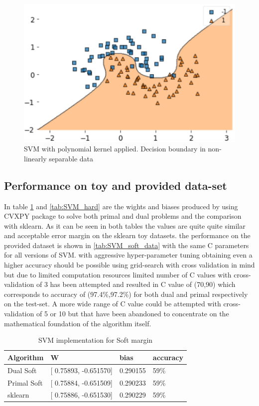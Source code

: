 \documentclass[10pt,onecolumn,letterpaper]{article}
\begin{document}
\begin{figure}[htb]
  \includegraphics[width=\linewidth]{svm_k_non.png}
  \caption{SVM with polynomial kernel applied. Decision boundary in non-linearly separable data}
  \label{fig:svm_exp_k}
\end{figure}





\subsection{Performance on toy and provided data-set}
In table \ref{tab:SVM_soft} and \ref{tab:SVM_hard} are the wights and biases produced by using CVXPY package to solve both primal and dual problems and the comparison with sklearn. As it can be seen in both tables the values are quite quite similar and acceptable error margin on the sklearn toy datasets. the performance on the provided dataset is shown in \ref{tab:SVM_soft_data} with the same C parameters for all versions of SVM. with aggressive hyper-parameter tuning obtaining even a higher accuracy should be possible using grid-search with cross validation in mind but due to limited computation resources limited number of C values with cross-validation of 3 has been attempted and resulted in C value of (70,90) which corresponds to accuracy of (97.4\%,97.2\%) for both dual and primal respectively on the test-set. A more wide range of C value could be attempted with cross-validation of 5 or 10 but that have been abandoned to concentrate on the mathematical foundation of the algorithm itself.


\begin{table}[htb]
\centering
\begin{tabular}{|l|l|l|l|} 
\toprule
Algorithm   & W                           & bias       & accuracy  \\ 
\hline
Dual Soft   & {[} 0.75893, -0.651570] & 0.290155 & 59\%      \\ 
\hline
Primal Soft & {[} 0.75884, -0.651509] & 0.290233 & 59\%      \\ 
\hline
sklearn     & {[} 0.75886, -0.651530] & 0.290229 & 59\%      \\
\bottomrule
\end{tabular}
\caption{SVM implementation for Soft margin}
\label{tab:SVM_soft}
\end{table}
\end{document}
